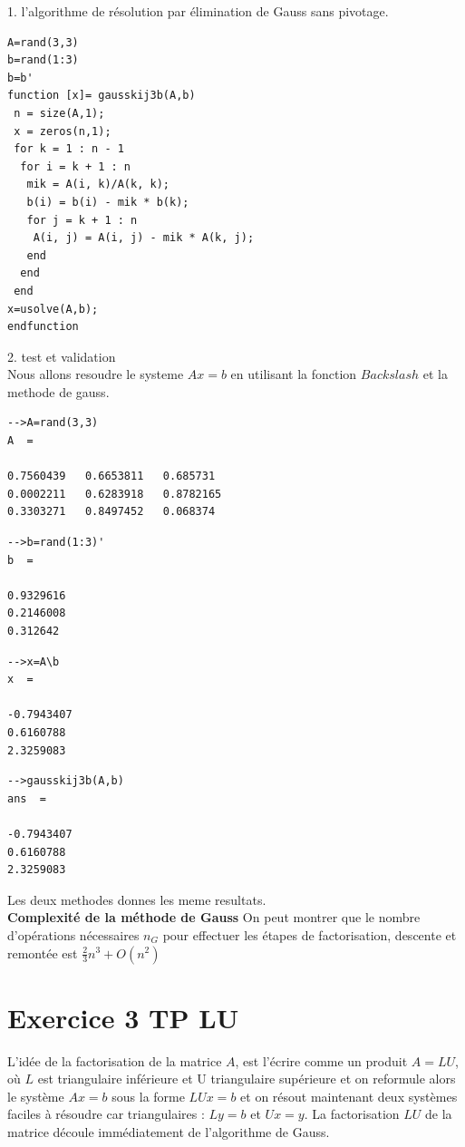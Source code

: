 \documentclass[12pt]{report}
\begin{document}
1. l’algorithme de résolution par élimination de Gauss sans pivotage.

\begin{lstlisting}
A=rand(3,3)
b=rand(1:3)
b=b'
function [x]= gausskij3b(A,b)
 n = size(A,1);
 x = zeros(n,1);
 for k = 1 : n - 1
  for i = k + 1 : n
   mik = A(i, k)/A(k, k);
   b(i) = b(i) - mik * b(k);
   for j = k + 1 : n
    A(i, j) = A(i, j) - mik * A(k, j);
   end 
  end 
 end 
x=usolve(A,b);
endfunction
\end{lstlisting}
2. test et validation\\

Nous allons resoudre le systeme $Ax=b$ en utilisant la fonction $Backslash$ et la methode de gauss.\\
\begin{lstlisting}
-->A=rand(3,3)
A  = 

0.7560439   0.6653811   0.685731 
0.0002211   0.6283918   0.8782165
0.3303271   0.8497452   0.068374 
\end{lstlisting}

\begin{lstlisting}
-->b=rand(1:3)'
b  = 

0.9329616
0.2146008
0.312642 
\end{lstlisting}

\begin{lstlisting}
-->x=A\b
x  = 

-0.7943407
0.6160788
2.3259083 
\end{lstlisting}

\begin{lstlisting}
-->gausskij3b(A,b)
ans  =

-0.7943407
0.6160788
2.3259083 
\end{lstlisting}

Les deux methodes donnes les meme resultats.\\


\textbf{Complexité de la méthode de Gauss}
On peut montrer que le nombre d’opérations nécessaires $n_{G}$ pour effectuer les étapes de factorisation, descente et remontée est $\frac{2}{3}n^3 + O(n^2)$


\section{Exercice 3 TP LU}

L’idée de la factorisation de la matrice $A$, est l’écrire comme un produit $A = LU$, où $L$ est triangulaire inférieure et U triangulaire supérieure et on reformule alors le système $Ax = b$ sous la forme $LUx = b$ et on résout maintenant deux systèmes faciles à résoudre car triangulaires : $Ly = b$ et $Ux = y$. La factorisation $LU$ de la matrice découle immédiatement de l’algorithme de Gauss.\\
\end{document}
